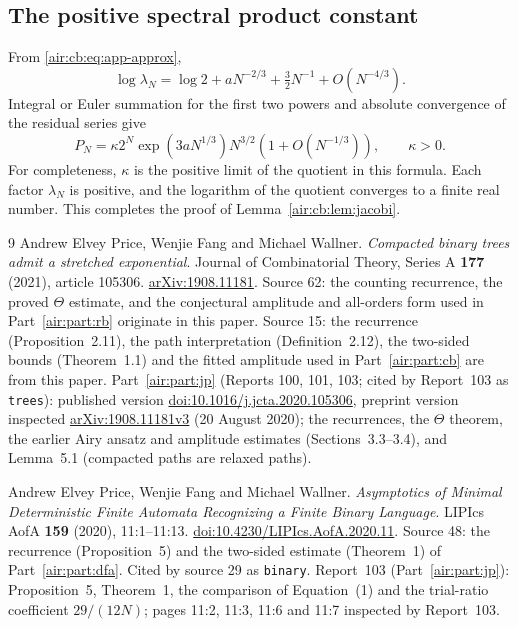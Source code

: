 \documentclass[11pt,letterpaper]{article}
\numberwithin{equation}{section}
\theoremstyle{remark}
\begin{document}
\subsection{The positive spectral product constant}
From \eqref{air:cb:eq:app-approx},
\[
\log\lambda_N=\log2+aN^{-2/3}+\tfrac32N^{-1}+O(N^{-4/3}).
\]
Integral or Euler summation for the first two powers and absolute convergence
of the residual series give
\[
P_N=\kappa2^N\exp(3aN^{1/3})N^{3/2}(1+O(N^{-1/3})),\qquad\kappa>0.
\]
For completeness, $\kappa$ is the positive limit of the quotient in this
formula. Each factor $\lambda_N$ is positive, and the logarithm of the
quotient converges to a finite real number. This completes the proof of
Lemma~\ref{air:cb:lem:jacobi}.

\begingroup
\small
\begin{thebibliography}{9}
Andrew Elvey Price, Wenjie Fang and Michael Wallner.
\emph{Compacted binary trees admit a stretched exponential}.
Journal of Combinatorial Theory, Series A \textbf{177} (2021), article 105306.
\href{https://arxiv.org/abs/1908.11181}{arXiv:1908.11181}.
Source 62: the counting recurrence, the proved $\Theta$ estimate, and the conjectural amplitude and all-orders form used in Part~\ref{air:part:rb} originate in this paper. Source 15: the recurrence (Proposition~2.11), the path interpretation (Definition~2.12), the two-sided bounds (Theorem~1.1) and the fitted amplitude used in Part~\ref{air:part:cb} are from this paper.
Part~\ref{air:part:jp} (Reports 100, 101, 103; cited by Report~103 as \texttt{trees}): published version \href{https://doi.org/10.1016/j.jcta.2020.105306}{doi:10.1016/j.jcta.2020.105306}, preprint version inspected \href{https://arxiv.org/abs/1908.11181v3}{arXiv:1908.11181v3} (20 August 2020); the recurrences, the $\Theta$ theorem, the earlier Airy ansatz and amplitude estimates (Sections~3.3--3.4), and Lemma~5.1 (compacted paths are relaxed paths).

Andrew Elvey Price, Wenjie Fang and Michael Wallner.
\emph{Asymptotics of Minimal Deterministic Finite Automata Recognizing a Finite Binary Language}.
LIPIcs AofA \textbf{159} (2020), 11:1--11:13.
\href{https://doi.org/10.4230/LIPIcs.AofA.2020.11}{doi:10.4230/LIPIcs.AofA.2020.11}.
Source 48: the recurrence (Proposition~5) and the two-sided estimate (Theorem~1) of Part~\ref{air:part:dfa}. Cited by source 29 as \texttt{binary}.
Report~103 (Part~\ref{air:part:jp}): Proposition~5, Theorem~1, the comparison of Equation~(1) and the trial-ratio coefficient $29/(12N)$; pages 11:2, 11:3, 11:6 and 11:7 inspected by Report~103.


\end{thebibliography}
\end{document}
